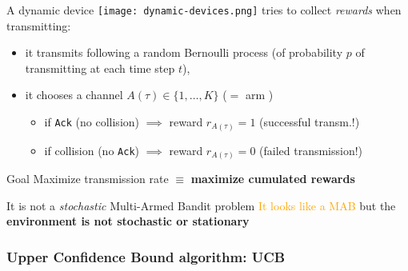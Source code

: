 \begin{frameO}

    A dynamic device \texttt{[image: dynamic-devices.png]}  tries to collect \emph{rewards} when transmitting:

    \begin{itemize}
        \item
            it transmits following a random Bernoulli process \newline
            (of probability \(p\) of transmitting at each time step \(t\)),
        \item
            it chooses a channel \(A(\tau) \in \{1,\dots,K\}\)
            \hfill{} ($=$ arm \slotmachine)
        \begin{itemize}
        \item
            if \texttt{Ack} (no collision) \hspace*{2pt} \(\implies\) reward
            \(r_{A(\tau)} = 1\) \hfill{} (successful transm.!)
        \item
            if collision (no \texttt{Ack}) \hspace*{2pt} \(\implies\) reward
            \(r_{A(\tau)} = 0\) \hfill{} (failed transmission!)
        \end{itemize}

    \end{itemize}

    \pause

    \begin{colorblock}{Goal}
        Maximize transmission rate \(\equiv\) \textbf{maximize cumulated rewards}
    \end{colorblock}

    \begin{lightblock}{It is not a \emph{stochastic} Multi-Armed Bandit problem}
        \textcolor{orange}{It looks like a MAB}
        but the \textbf{environment is not stochastic or stationary}
    \end{lightblock}

\end{frameO}

\subsubsection{Upper Confidence Bound algorithm: UCB}

